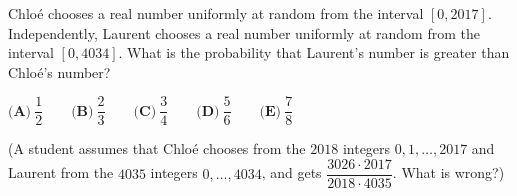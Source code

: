 Chlo\'e chooses a real number uniformly at random from the interval $[0,2017]$. Independently, Laurent chooses a real number uniformly at random from the interval $[0,4034]$. What is the probability that Laurent's number is greater than Chlo\'e's number?

$\textbf{(A)}\ \dfrac{1}{2}\qquad\textbf{(B)}\ \dfrac{2}{3}\qquad\textbf{(C)}\ \dfrac{3}{4}\qquad\textbf{(D)}\ \dfrac{5}{6}\qquad\textbf{(E)}\ \dfrac{7}{8}$

(A student assumes that Chlo\'e chooses from the $2018$ integers $0,1,\dots,2017$ and Laurent from the $4035$ integers $0,\dots,4034$, and gets $\dfrac{3026\cdot2017}{2018\cdot4035}$. What is wrong?)

